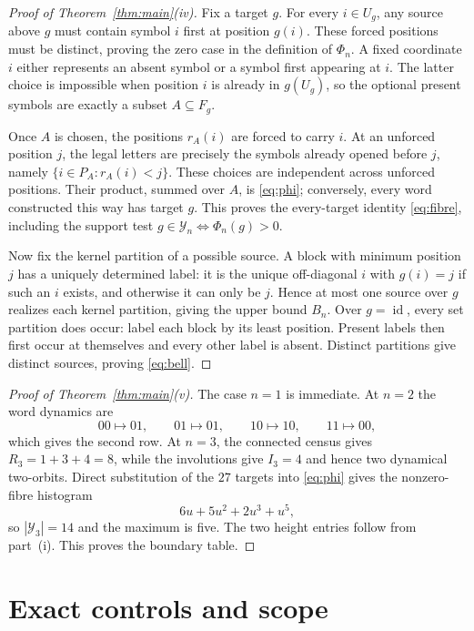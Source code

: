 \documentclass[a4paper,10pt]{amsart}
\theoremstyle{remark}
\newcommand{\Y}{\mathcal Y}
\newcommand{\id}{\operatorname{id}}
\begin{document}
\begin{proof}[Proof of Theorem~\ref{thm:main}(iv)]
Fix a target $g$.  For every $i\in U_g$, any source above $g$ must contain
symbol $i$ first at position $g(i)$.  These forced positions must be
distinct, proving the zero case in the definition of $\Phi_n$.  A fixed
coordinate $i$ either represents an absent symbol or a symbol first
appearing at $i$.  The latter choice is impossible when position $i$ is
already in $g(U_g)$, so the optional present symbols are exactly a subset
$A\subseteq F_g$.

Once $A$ is chosen, the positions $r_A(i)$ are forced to carry $i$.  At an
unforced position $j$, the legal letters are precisely the symbols already
opened before $j$, namely
$\{i\in P_A:r_A(i)<j\}$.  These choices are independent across unforced
positions.  Their product, summed over $A$, is \eqref{eq:phi}; conversely,
every word constructed this way has target $g$.  This proves the
every-target identity \eqref{eq:fibre}, including the support test
$g\in\Y_n\Longleftrightarrow\Phi_n(g)>0$.

Now fix the kernel partition of a possible source.  A block with minimum
position $j$ has a uniquely determined label: it is the unique
off-diagonal $i$ with $g(i)=j$ if such an $i$ exists, and otherwise it can
only be $j$.  Hence at most one source over $g$ realizes each kernel
partition, giving the upper bound $B_n$.  Over $g=\id$, every set partition
does occur: label each block by its least position.  Present labels then
first occur at themselves and every other label is absent.  Distinct
partitions give distinct sources, proving \eqref{eq:bell}.
\end{proof}

\begin{proof}[Proof of Theorem~\ref{thm:main}(v)]
The case $n=1$ is immediate.  At $n=2$ the word dynamics are
\[
 00\mapsto01,\qquad01\mapsto01,\qquad
 10\mapsto10,\qquad11\mapsto00,
\]
which gives the second row.  At $n=3$, the connected census gives
$R_3=1+3+4=8$, while the involutions give $I_3=4$ and hence two dynamical
two-orbits.  Direct substitution of the $27$ targets into
\eqref{eq:phi} gives the nonzero-fibre histogram
\[
 6u+5u^2+2u^3+u^5,
\]
so $|\Y_3|=14$ and the maximum is five.  The two height entries follow from
part~(i).  This proves the boundary table.
\end{proof}

\medskip
\section{Exact controls and scope}
\end{document}
